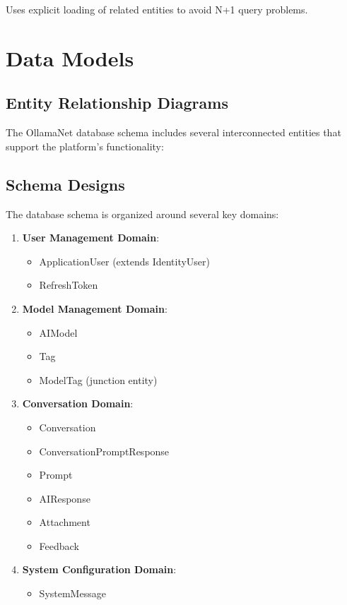 Uses explicit loading of related entities to avoid N+1 query problems.

\section{Data Models}

\subsection{Entity Relationship Diagrams}

The OllamaNet database schema includes several interconnected entities that support the platform's functionality:


\subsection{Schema Designs}

The database schema is organized around several key domains:

\begin{enumerate}
   \item \textbf{User Management Domain}:
   \begin{itemize}
      \item ApplicationUser (extends IdentityUser)
      \item RefreshToken
   \end{itemize}

   \item \textbf{Model Management Domain}:
   \begin{itemize}
      \item AIModel
      \item Tag
      \item ModelTag (junction entity)
   \end{itemize}

   \item \textbf{Conversation Domain}:
   \begin{itemize}
      \item Conversation
      \item ConversationPromptResponse
      \item Prompt
      \item AIResponse
      \item Attachment
      \item Feedback
   \end{itemize}

   \item \textbf{System Configuration Domain}:
   \begin{itemize}
      \item SystemMessage
   \end{itemize}
\end{enumerate}

